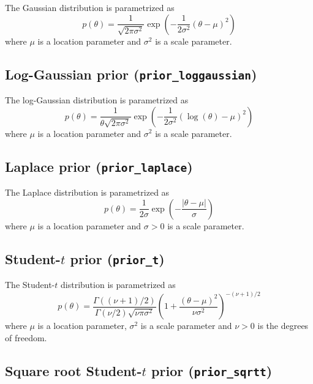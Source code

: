 \documentclass[twoside,11pt]{article}
\newcommand{\code}[1]{{\normalfont\texttt{#1}}}
\begin{document}
The Gaussian distribution is parametrized as
\begin{equation}
p(\theta)=\frac{1}{\sqrt{2\pi\sigma^2}}\exp\left(-\frac{1}{2\sigma^2}(\theta-\mu)^2\right)
\end{equation}
where $\mu$ is a location parameter and $\sigma^2$ is a scale
parameter.

\subsection*{Log-Gaussian prior (\code{prior\_loggaussian})}

The log-Gaussian distribution is parametrized as
\begin{equation}
p(\theta)=\frac{1}{\theta\sqrt{2\pi\sigma^2}}\exp\left(-\frac{1}{2\sigma^2}(\log(\theta)-\mu)^2\right)
\end{equation}
where $\mu$ is a location parameter and $\sigma^2$ is a scale
parameter.

\subsection*{Laplace prior (\code{prior\_laplace})}

The Laplace distribution is parametrized as
\begin{equation}
p(\theta)=\frac{1}{2\sigma}\exp\left(-\frac{|\theta-\mu|}{\sigma}\right)
\end{equation}
where $\mu$ is a location parameter and $\sigma>0$ is a scale
parameter.

\subsection*{Student-$t$ prior (\code{prior\_t})}

The Student-$t$ distribution is parametrized as
\begin{equation}
p(\theta)=\frac{\Gamma((\nu+1)/2)}{\Gamma(\nu/2)\sqrt{\nu\pi\sigma^2}}\left(1+\frac{(\theta-\mu)^2}{\nu\sigma^2}\right)^{-(\nu+1)/2}
\end{equation}
where $\mu$ is a location parameter, $\sigma^2$ is a scale
parameter and $\nu>0$ is the degrees of freedom.

\subsection*{Square root Student-$t$ prior (\code{prior\_sqrtt})}
\end{document}
